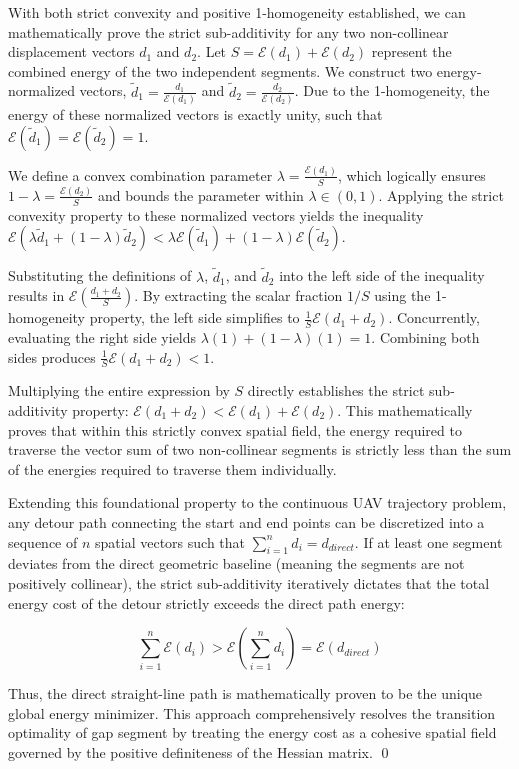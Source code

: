 With both strict convexity and positive 1-homogeneity established, we can mathematically prove the strict sub-additivity for any two non-collinear displacement vectors $d_1$ and $d_2$.
Let $S = \mathcal{E}(d_1) + \mathcal{E}(d_2)$ represent the combined energy of the two independent segments.
We construct two energy-normalized vectors, $\tilde{d}_1 = \frac{d_1}{\mathcal{E}(d_1)}$ and $\tilde{d}_2 = \frac{d_2}{\mathcal{E}(d_2)}$.
Due to the 1-homogeneity, the energy of these normalized vectors is exactly unity, such that $\mathcal{E}(\tilde{d}_1) = \mathcal{E}(\tilde{d}_2) = 1$.

We define a convex combination parameter $\lambda = \frac{\mathcal{E}(d_1)}{S}$, which logically ensures $1 - \lambda = \frac{\mathcal{E}(d_2)}{S}$ and bounds the parameter within $\lambda \in (0, 1)$.
Applying the strict convexity property to these normalized vectors yields the inequality $\mathcal{E}(\lambda \tilde{d}_1 + (1-\lambda)\tilde{d}_2) < \lambda \mathcal{E}(\tilde{d}_1) + (1-\lambda)\mathcal{E}(\tilde{d}_2)$.

Substituting the definitions of $\lambda$, $\tilde{d}_1$, and $\tilde{d}_2$ into the left side of the inequality results in $\mathcal{E}\left(\frac{d_1 + d_2}{S}\right)$.
By extracting the scalar fraction $1/S$ using the 1-homogeneity property, the left side simplifies to $\frac{1}{S}\mathcal{E}(d_1 + d_2)$.
Concurrently, evaluating the right side yields $\lambda(1) + (1-\lambda)(1) = 1$.
Combining both sides produces $\frac{1}{S}\mathcal{E}(d_1 + d_2) < 1$.

Multiplying the entire expression by $S$ directly establishes the strict sub-additivity property: $\mathcal{E}(d_1 + d_2) < \mathcal{E}(d_1) + \mathcal{E}(d_2)$.
This mathematically proves that within this strictly convex spatial field, the energy required to traverse the vector sum of two non-collinear segments is strictly less than the sum of the energies required to traverse them individually.

Extending this foundational property to the continuous UAV trajectory problem, any detour path connecting the start and end points can be discretized into a sequence of $n$ spatial vectors such that $\sum_{i=1}^{n} d_i = d_{direct}$.
If at least one segment deviates from the direct geometric baseline (meaning the segments are not positively collinear), the strict sub-additivity iteratively dictates that the total energy cost of the detour strictly exceeds the direct path energy:

$$\sum_{i=1}^{n}\mathcal{E}(d_i) > \mathcal{E}\left(\sum_{i=1}^{n}d_i\right) = \mathcal{E}(d_{direct})$$

Thus, the direct straight-line path is mathematically proven to be the unique global energy minimizer.
This approach comprehensively resolves the transition optimality of gap segment by treating the energy cost as a cohesive spatial field governed by the positive definiteness of the Hessian matrix.
\qed

